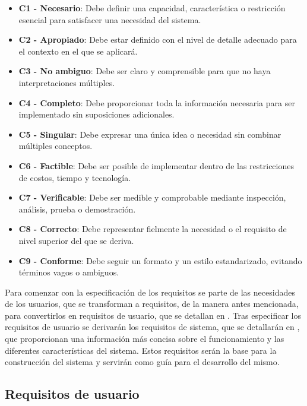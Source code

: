 \begin{itemize}

    \item \textbf{C1 - Necesario}: Debe definir una capacidad, característica o restricción esencial para satisfacer una necesidad del sistema.
    \item \textbf{C2 - Apropiado}: Debe estar definido con el nivel de detalle adecuado para el contexto en el que se aplicará.
    \item \textbf{C3 - No ambiguo}: Debe ser claro y comprensible para que no haya interpretaciones múltiples.
    \item \textbf{C4 - Completo}: Debe proporcionar toda la información necesaria para ser implementado sin suposiciones adicionales.
    \item \textbf{C5 - Singular}: Debe expresar una única idea o necesidad sin combinar múltiples conceptos.
    \item \textbf{C6 - Factible}: Debe ser posible de implementar dentro de las restricciones de costos, tiempo y tecnología.
    \item \textbf{C7 - Verificable}: Debe ser medible y comprobable mediante inspección, análisis, prueba o demostración.
    \item \textbf{C8 - Correcto}: Debe representar fielmente la necesidad o el requisito de nivel superior del que se deriva.
    \item \textbf{C9 - Conforme}: Debe seguir un formato y un estilo estandarizado, evitando términos vagos o ambiguos.

\end{itemize}

Para comenzar con la especificación de los requisitos se parte de las necesidades de los usuarios, que se transforman a requisitos, de la manera antes mencionada, para convertirlos en requisitos de usuario, que se detallan en .
Tras especificar los requisitos de usuario se derivarán los requisitos de sistema, que se detallarán en , que proporcionan una información más concisa sobre el funcionamiento y las diferentes características del sistema.
Estos requisitos serán la base para la construcción del sistema y servirán como guía para el desarrollo del mismo.


\subsection{Requisitos de usuario}\label{subsec:requisitos-usuario}

